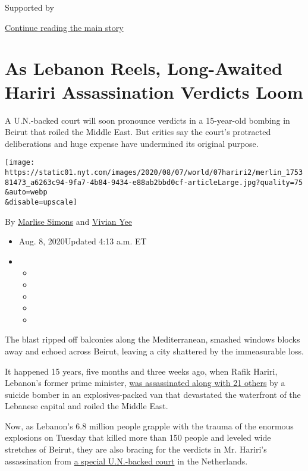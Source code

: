 Supported by

\protect\hyperlink{after-sponsor}{Continue reading the main story}

\hypertarget{as-lebanon-reels-long-awaited-hariri-assassination-verdicts-loom}{%
\section{As Lebanon Reels, Long-Awaited Hariri Assassination Verdicts
Loom}\label{as-lebanon-reels-long-awaited-hariri-assassination-verdicts-loom}}

A U.N.-backed court will soon pronounce verdicts in a 15-year-old
bombing in Beirut that roiled the Middle East. But critics say the
court's protracted deliberations and huge expense have undermined its
original purpose.

\texttt{[image: https://static01.nyt.com/images/2020/08/07/world/07hariri2/merlin\_175381473\_a6263c94-9fa7-4b84-9434-e88ab2bbd0cf-articleLarge.jpg?quality=75\\\&auto=webp\\\&disable=upscale]}

By \href{https://www.nytimes.com/by/marlise-simons}{Marlise Simons} and
\href{https://www.nytimes.com/by/vivian-yee}{Vivian Yee}

\begin{itemize}
\item
  Aug. 8, 2020Updated 4:13 a.m. ET
\item
  \begin{itemize}
  \item
  \item
  \item
  \item
  \item
  \end{itemize}
\end{itemize}

The blast ripped off balconies along the Mediterranean, smashed windows
blocks away and echoed across Beirut, leaving a city shattered by the
immeasurable loss.

It happened 15 years, five months and three weeks ago, when Rafik
Hariri, Lebanon's former prime minister,
\href{https://www.nytimes.com/2005/02/14/world/africa/former-prime-minister-rafik-hariri-killed-in-explosion.html}{was
assassinated along with 21 others} by a suicide bomber in an
explosives-packed van that devastated the waterfront of the Lebanese
capital and roiled the Middle East.

Now, as Lebanon's 6.8 million people grapple with the trauma of the
enormous explosions on Tuesday that killed more than 150 people and
leveled wide stretches of Beirut, they are also bracing for the verdicts
in Mr. Hariri's assassination from \href{https://www.stl-tsl.org/en}{a
special U.N.-backed court} in the Netherlands.

